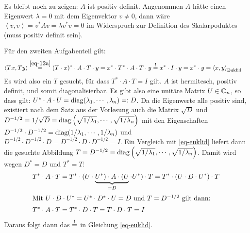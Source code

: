 Es bleibt noch zu zeigen: $A$ ist positiv definit. Angenommen $A$ hätte einen
Eigenwert $\lambda = 0$ mit dem Eigenvektor $v \ne 0$, dann wäre
$\left<v,v\right> = v^* A v = \lambda v^* v = 0$ im Widerspruch zur Definition
des Skalarpoduktes (muss positiv definit sein).

Für den zweiten Aufgabenteil gilt:
\begin{align}
\label{eq-euklid}
  \left<T x,T y\right> &\overset{\eqref{eq-12a}}{=} (T\cdot x)^* \cdot A \cdot T \cdot y
    = x^* \cdot T^* \cdot A \cdot T  \cdot y \overset{!}{=}   x^* \cdot I \cdot y
    = x^* \cdot y =\left<x, y\right>_\text{Euklid}
\end{align}
Es wird also ein $T$ gesucht, für dass $T^* \cdot A \cdot T = I$ gilt. $A$ ist
hermitesch, positiv definit, und somit diagonalisierbar. Es gibt also eine
unitäre Matrix $U \in \mathbb O_n$, so dass gilt:
$U^* \cdot A \cdot U = \mathrm{diag}(\lambda_1, \cdots,\lambda_n) =: D$. Da die Eigenwerte alle
positiv sind, existiert nach dem Satz aus der Vorlesung auch die Matrix $\sqrt{D}$ und
$D^{-1/2} = 1 / \sqrt{D} = \mathrm{diag}\left(\sqrt{1 / \lambda_1}, \cdots, \sqrt{1 /\lambda_n}\right)$
mit den Eigenschaften $D^{-1/2} \cdot D^{-1/2} = \mathrm{diag}(1/\lambda_1, \cdots, 1/ \lambda_n)$
und $D^{-1/2} \cdot D^{-1/2} \cdot D = D^{-1/2} \cdot D \cdot D^{-1/2} = I$. Ein Vergleich
mit \eqref{eq-euklid} liefert dann die gesuchte Abbildung
$T =  D^{-1/2} =  \mathrm{diag}\left(\sqrt{1 / \lambda_1}, \cdots, \sqrt{1 /\lambda_n}\right)$.
Damit wird wegen $D^* = D$ und $T^* =  T$:
\begin{align*}
  \nonumber
  T^* \cdot A \cdot T &= T^* \cdot
   (U \cdot \underbrace{U^*) \cdot A  \cdot (U}_{= D} \cdot U^*) \cdot T =
  T^* \cdot (U \cdot D \cdot U^*) \cdot T\\
\intertext{Mit $U \cdot D \cdot U^* = U^* \cdot D^* \cdot U = D$
und $T =  D^{-1/2}$ gilt dann:}
  T^* \cdot A \cdot T &=  T^* \cdot D \cdot T =  T \cdot D \cdot T= I
\end{align*}
Daraus folgt dann das $\overset{!}{=} $ in Gleichung \eqref{eq-euklid}.
